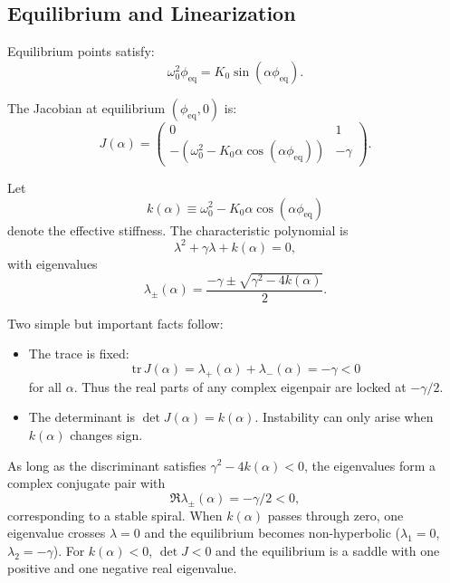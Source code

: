 \documentclass[11pt,twocolumn]{article}
\begin{document}
\subsection{Equilibrium and Linearization}

Equilibrium points satisfy:
\begin{equation}
  \omega_0^2 \phi_{\text{eq}} = K_0 \sin(\alpha \phi_{\text{eq}}).
\end{equation}

The Jacobian at equilibrium $(\phi_{\text{eq}}, 0)$ is:
\begin{equation}
  J(\alpha) = \begin{pmatrix}
    0 & 1 \\
    -(\omega_0^2 - K_0 \alpha \cos(\alpha \phi_{\text{eq}})) & -\gamma
  \end{pmatrix}.
\end{equation}

Let
\begin{equation}
  k(\alpha) \equiv \omega_0^2 - K_0 \alpha \cos(\alpha \phi_{\text{eq}})
\end{equation}
denote the effective stiffness. The characteristic polynomial is
\begin{equation}
  \lambda^2 + \gamma \lambda + k(\alpha) = 0,
\end{equation}
with eigenvalues
\begin{equation}
  \lambda_{\pm}(\alpha) = \frac{-\gamma \pm \sqrt{\gamma^2 - 4 k(\alpha)}}{2}.
\end{equation}

Two simple but important facts follow:
\begin{itemize}
  \item The trace is fixed:
  \[
    \mathrm{tr}\,J(\alpha) = \lambda_+(\alpha) + \lambda_-(\alpha) = -\gamma < 0
  \]
  for all $\alpha$. Thus the real parts of any complex eigenpair are locked at $-\gamma/2$.
  \item The determinant is $\det J(\alpha) = k(\alpha)$. Instability can only arise when $k(\alpha)$ changes sign.
\end{itemize}

As long as the discriminant satisfies $\gamma^2 - 4 k(\alpha) < 0$, the eigenvalues form a complex conjugate pair with
\[
\Re \lambda_{\pm}(\alpha) = -\gamma/2 < 0,
\]
corresponding to a stable spiral. When $k(\alpha)$ passes through zero, one eigenvalue crosses $\lambda=0$ and the equilibrium becomes non-hyperbolic ($\lambda_1=0$, $\lambda_2=-\gamma$). For $k(\alpha)<0$, $\det J<0$ and the equilibrium is a saddle with one positive and one negative real eigenvalue.
\end{document}
